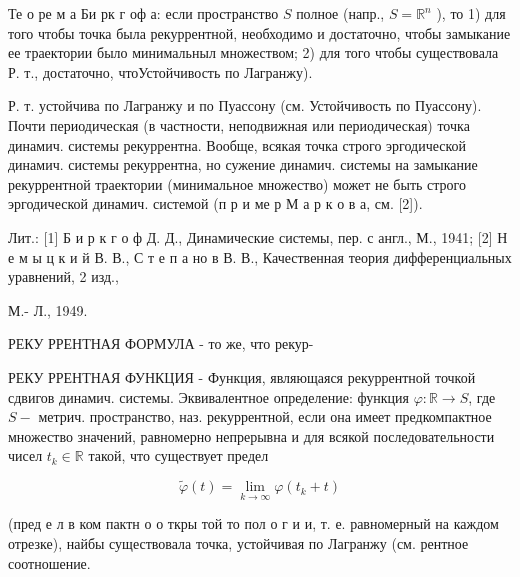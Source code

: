 \documentclass[10pt]{article}
\begin{document}
Те о ре м а Би рк г оф а: если пространство $S$ полное (напр., $S=\mathbb{R}^{n}$ ), то 1) для того чтобы точка была рекуррентной, необходимо и достаточно, чтобы замыкание ее траектории было минимальныл множеством; 2) для того чтобы существовала Р. т., достаточно, чтоУстойчивость по Лагранжу).



Р. т. устойчива по Лагранжу и по Пуассону (см. Устойчивость по Пуассону). Почти периодическая (в частности, неподвижная или периодическая) точка динамич. системы рекуррентна. Вообще, всякая точка строго эргодической динамич. системы рекуррентна, но сужение динамич. системы на замыкание рекуррентной траектории (минимальное множество) может не быть строго эргодической динамич. системой (п р и ме р М а р к о в а, см. [2]).



Лит.: [1] Б и р к г о ф Д. Д., Динамические системы, пер. с англ., М., 1941; [2] Н е м ы ц к и й В. В., С т е п а но в В. В., Качественная теория дифференциальных уравнений, 2 изд.,

М.- Л., 1949.



РЕКУ РРЕНТНАЯ ФОРМУЛА - то же, что рекур-



РЕКУ РРЕНТНАЯ ФУНКЦИЯ - Функция, являющаяся рекуррентной точкой сдвигов динамич. системы. Эквивалентное определение: функция $\varphi: \mathbb{R} \rightarrow S$, где $S-$ метрич. пространство, наз. рекуррентной, если она имеет предкомпактное множество значений, равномерно непрерывна и для всякой последовательности чисел $t_{k} \in \mathbb{R}$ такой, что существует предел



\[

\tilde{\varphi}(t)=\lim _{k \rightarrow \infty} \varphi\left(t_{k}+t\right)

\]



(пред е л в ком пактн о о ткры той то пол о г и и, т. е. равномерный на каждом отрезке), найбы существовала точка, устойчивая по Лагранжу (см. рентное соотношение.
\end{document}
